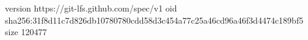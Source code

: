 version https://git-lfs.github.com/spec/v1
oid sha256:31f8d11c7d826db10780780cdd58d3c454a77c25a46cd96a46f3d4474c189bf5
size 120477
